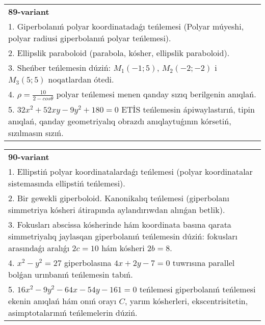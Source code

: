 \documentclass{article}
\begin{document}
\begin{tabular}{m{17cm}}
\textbf{89-variant}\\
1. Giperbolanıń polyar koordinatadaǵı teńlemesi (Polyar múyeshi, polyar radiusi giperbolanıń polyar teńlemesi).\\

2. Ellipslik paraboloid (parabola, kósher, ellipslik paraboloid).\\

3. Sheńber teńlemesin dúziń: $M_1 (-1;5) $, $M_2 (-2;-2) $ i $M_3 (5;5) $ noqatlardan ótedi.\\

4. $\rho = \frac{10}{2 - cos\theta}$ polyar teńlemesi menen qanday sızıq berilgenin anıqlań.  \\

5. $32x^{2} + 52xy - 9y^{2} + 180 = 0$ ETİS teńlemesin ápiwaylastırıń, tipin anıqlań, qanday geometriyalıq obrazdı anıqlaytuǵının kórsetiń, sızılmasın sızıń.  
\end{tabular}
\vspace{1cm}


\begin{tabular}{m{17cm}}
\textbf{90-variant}\\
1. Ellipstiń polyar koordinatalardaǵı teńlemesi (polyar koordinatalar sistemasında ellipstiń teńlemesi).\\

2. Bir gewekli giperboloid. Kanonikalıq teńlemesi (giperbolanı simmetriya kósheri átirapında aylandırıwdan alınǵan betlik).\\

3. Fokusları abscissa kósherinde hám koordinata basına qarata simmetriyalıq jaylasqan giperbolanıń teńlemesin dúziń: fokusları arasındaǵı aralıǵı $2 c=10$ hám kósheri $2 b=8$.\\

4. $x^{2} - y^{2} = 27$ giperbolasına $4x + 2y - 7 = 0$ tuwrısına parallel bolǵan urınbanıń teńlemesin tabıń.  \\

5. $16x^{2} - 9y^{2} - 64x - 54y - 161 = 0$ teńlemesi giperbolanıń teńlemesi ekenin anıqlań hám onıń orayı $C$, yarım kósherleri, ekscentrisitetin, asimptotalarınıń teńlemelerin dúziń.  
\end{tabular}
\vspace{1cm}
\end{document}
